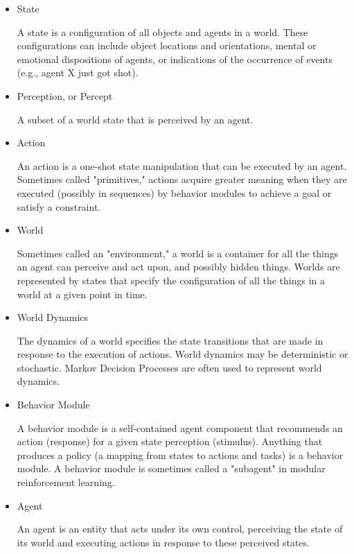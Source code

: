 \begin{itemize}

\item State

  A state is a configuration of all objects and agents in a world.
  These configurations can include object locations and orientations,
  mental or emotional dispositions of agents, or indications of the
  occurrence of events (e.g., agent X just got shot).

\item Perception, or Percept

  A subset of a world state that is perceived by an agent.

\item Action

  An action is a one-shot state manipulation that can be executed by
  an agent.  Sometimes called "primitives," actions acquire greater
  meaning when they are executed (possibly in sequences) by behavior
  modules to achieve a goal or satisfy a constraint.


\item World

  Sometimes called an "environment," a world is a container for all
  the things an agent can perceive and act upon, and possibly hidden
  things.  Worlds are represented by states that specify the
  configuration of all the things in a world at a given point in time.

\item World Dynamics

  The dynamics of a world specifies the state transitions that are
  made in response to the execution of actions.  World dynamics may be
  deterministic or stochastic.  Markov Decision Processes are often
  used to represent world dynamics.

\item Behavior Module

  A behavior module is a self-contained agent component that
  recommends an action (response) for a given state perception
  (stimulus).  Anything that produces a policy (a mapping from states
  to actions and tasks) is a behavior module.  A behavior module is
  sometimes called a "subagent" in modular reinforcement learning.

\item Agent

  An agent is an entity that acts under its own control, perceiving
  the state of its world and executing actions in response to these
  perceived states.


\end{itemize}
